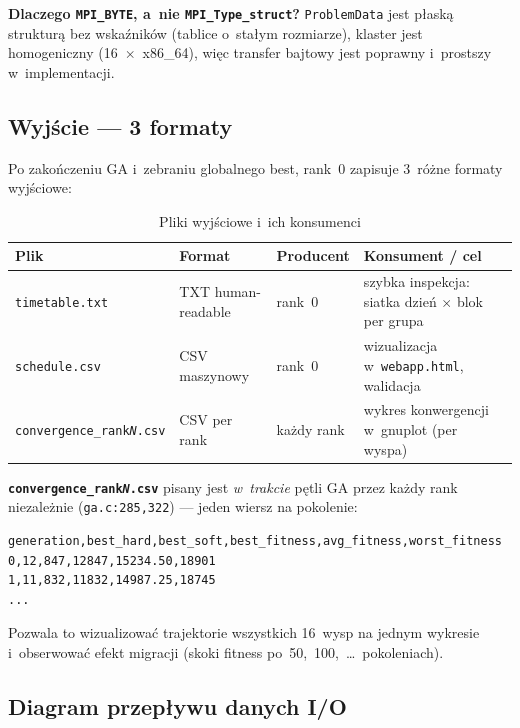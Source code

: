 \documentclass{common/sprawozdanie-agh}
\begin{document}
\textbf{Dlaczego \texttt{MPI\_BYTE}, a~nie \texttt{MPI\_Type\_struct}?} \texttt{ProblemData} jest płaską strukturą bez wskaźników (tablice o~stałym rozmiarze), klaster jest homogeniczny (16~$\times$~x86\_64), więc transfer bajtowy jest poprawny i~prostszy w~implementacji.

\subsection{Wyjście --- 3 formaty}

Po zakończeniu GA i~zebraniu globalnego best, rank~0 zapisuje 3~różne formaty wyjściowe:

\begin{table}[H]
\centering\small
\renewcommand{\arraystretch}{1.2}
\begin{tabularx}{\textwidth}{lll>{\raggedright\arraybackslash}X}
\toprule
\textbf{Plik} & \textbf{Format} & \textbf{Producent} & \textbf{Konsument / cel} \\
\midrule
\texttt{timetable.txt}            & TXT human-readable      & rank~0 & szybka inspekcja: siatka dzień $\times$ blok per grupa \\
\texttt{schedule.csv}             & CSV maszynowy           & rank~0 & wizualizacja w~\texttt{webapp.html}, walidacja \\
\texttt{convergence\_rank\textit{N}.csv} & CSV per rank      & każdy rank & wykres konwergencji w~gnuplot (per wyspa) \\
\bottomrule
\end{tabularx}
\caption{Pliki wyjściowe i~ich konsumenci}
\label{tab:io-outputs}
\end{table}

\textbf{\texttt{convergence\_rank\textit{N}.csv}} pisany jest \emph{w~trakcie} pętli GA przez każdy rank niezależnie (\texttt{ga.c:285,322}) --- jeden wiersz na pokolenie:

\begin{lstlisting}[style=bashstyle, caption={Format pliku konwergencji}]
generation,best_hard,best_soft,best_fitness,avg_fitness,worst_fitness
0,12,847,12847,15234.50,18901
1,11,832,11832,14987.25,18745
...
\end{lstlisting}

Pozwala to wizualizować trajektorie wszystkich 16~wysp na jednym wykresie i~obserwować efekt migracji (skoki fitness po~50,~100,~\ldots~pokoleniach).

\subsection{Diagram przepływu danych I/O}
\end{document}
